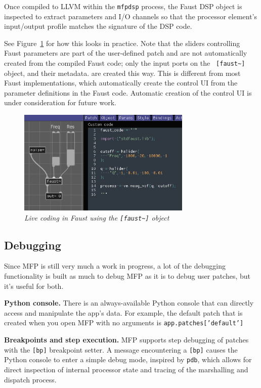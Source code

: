 \documentclass[a4paper]{article}
\def\:{\hskip0pt}
\begin{document}
Once compiled to LLVM within the {\tt mfpdsp} process, the Faust
DSP object is inspected to extract parameters and I/O channels so
that the processor element's input/output profile matches the
signature of the DSP code.

See Figure~\ref{fig:faustlivecoding} for how this looks in
practice. Note that the sliders controlling Faust parameters are
part of the user-defined patch and are not automatically created
from the compiled Faust code; only the input ports on the {\tt
[faust\textasciitilde]} object, and their metadata. are created
this way. This is different from most Faust implementations,
which automatically create the control UI from the parameter
definitions in the Faust code. Automatic creation of the control
UI is under consideration for future work.

\begin{figure}[ht]
\centerline{\includegraphics[width=3.25in]{faust_livecoding.png}}
\caption{\label{fig:faustlivecoding}{
    \it Live coding in Faust using the {\tt [faust\textasciitilde]} object
}}
\end{figure}


\subsection{Debugging}

Since MFP is still very much a work in progress, a lot of the
debugging functionality is built as much to debug MFP as it is to
debug user patches, but it's useful for both.

{\bf Python console.} There is an always\:-\:available Python console
that can directly access and manipulate the app's data.  For
example, the default patch that is created when you open MFP with
no arguments is {\tt app.patches['default']}

{\bf Breakpoints and step execution.} MFP supports step debugging
of patches with the {\tt [bp]} breakpoint setter. A message
encountering a {\tt [bp]} causes the Python console to enter a
simple debug mode, inspired by {\tt pdb}, which allows for direct
inspection of internal processor state and tracing of the
marshalling and dispatch process.
\end{document}
